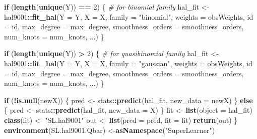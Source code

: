 \documentclass[
]{book}
\newenvironment{Shaded}{\begin{snugshade}}{\end{snugshade}}
\newcommand{\AttributeTok}[1]{\textcolor[rgb]{0.13,0.29,0.53}{#1}}
\newcommand{\CommentTok}[1]{\textcolor[rgb]{0.56,0.35,0.01}{\textit{#1}}}
\newcommand{\ControlFlowTok}[1]{\textcolor[rgb]{0.13,0.29,0.53}{\textbf{#1}}}
\newcommand{\DecValTok}[1]{\textcolor[rgb]{0.00,0.00,0.81}{#1}}
\newcommand{\FunctionTok}[1]{\textcolor[rgb]{0.13,0.29,0.53}{\textbf{#1}}}
\newcommand{\NormalTok}[1]{#1}
\newcommand{\OtherTok}[1]{\textcolor[rgb]{0.56,0.35,0.01}{#1}}
\newcommand{\SpecialCharTok}[1]{\textcolor[rgb]{0.81,0.36,0.00}{\textbf{#1}}}
\newcommand{\StringTok}[1]{\textcolor[rgb]{0.31,0.60,0.02}{#1}}
\begin{document}
\begin{Shaded}
\begin{Highlighting}[]
  \ControlFlowTok{if}\NormalTok{ (}\FunctionTok{length}\NormalTok{(}\FunctionTok{unique}\NormalTok{(Y)) }\SpecialCharTok{==} \DecValTok{2}\NormalTok{) \{ }\CommentTok{\# for binomial family}
\NormalTok{    hal\_fit }\OtherTok{\textless{}{-}}\NormalTok{ hal9001}\SpecialCharTok{::}\FunctionTok{fit\_hal}\NormalTok{(}\AttributeTok{Y =}\NormalTok{ Y, }\AttributeTok{X =}\NormalTok{ X, }\AttributeTok{family =} \StringTok{"binomial"}\NormalTok{, }
                                \AttributeTok{weights =}\NormalTok{ obsWeights, }\AttributeTok{id =}\NormalTok{ id, }\AttributeTok{max\_degree =}\NormalTok{ max\_degree, }
                                \AttributeTok{smoothness\_orders =}\NormalTok{ smoothness\_orders, }\AttributeTok{num\_knots =}\NormalTok{ num\_knots, }
\NormalTok{                                ...)}
\NormalTok{  \}}
  
  \ControlFlowTok{if}\NormalTok{ (}\FunctionTok{length}\NormalTok{(}\FunctionTok{unique}\NormalTok{(Y)) }\SpecialCharTok{\textgreater{}} \DecValTok{2}\NormalTok{) \{ }\CommentTok{\# for quasibinomial family}
\NormalTok{    hal\_fit }\OtherTok{\textless{}{-}}\NormalTok{ hal9001}\SpecialCharTok{::}\FunctionTok{fit\_hal}\NormalTok{(}\AttributeTok{Y =}\NormalTok{ Y, }\AttributeTok{X =}\NormalTok{ X, }\AttributeTok{family =} \StringTok{"gaussian"}\NormalTok{, }
                                \AttributeTok{weights =}\NormalTok{ obsWeights, }\AttributeTok{id =}\NormalTok{ id, }\AttributeTok{max\_degree =}\NormalTok{ max\_degree, }
                                \AttributeTok{smoothness\_orders =}\NormalTok{ smoothness\_orders, }\AttributeTok{num\_knots =}\NormalTok{ num\_knots, }
\NormalTok{                                ...)}
\NormalTok{  \}}
  
  \ControlFlowTok{if}\NormalTok{ (}\SpecialCharTok{!}\FunctionTok{is.null}\NormalTok{(newX)) \{}
\NormalTok{    pred }\OtherTok{\textless{}{-}}\NormalTok{ stats}\SpecialCharTok{::}\FunctionTok{predict}\NormalTok{(hal\_fit, }\AttributeTok{new\_data =}\NormalTok{ newX)}
\NormalTok{  \}}
  \ControlFlowTok{else}\NormalTok{ \{}
\NormalTok{    pred }\OtherTok{\textless{}{-}}\NormalTok{ stats}\SpecialCharTok{::}\FunctionTok{predict}\NormalTok{(hal\_fit, }\AttributeTok{new\_data =}\NormalTok{ X)}
\NormalTok{  \}}
\NormalTok{  fit }\OtherTok{\textless{}{-}} \FunctionTok{list}\NormalTok{(}\AttributeTok{object =}\NormalTok{ hal\_fit)}
  \FunctionTok{class}\NormalTok{(fit) }\OtherTok{\textless{}{-}} \StringTok{"SL.hal9001"}
\NormalTok{  out }\OtherTok{\textless{}{-}} \FunctionTok{list}\NormalTok{(}\AttributeTok{pred =}\NormalTok{ pred, }\AttributeTok{fit =}\NormalTok{ fit)}
  \FunctionTok{return}\NormalTok{(out)}
\NormalTok{\}}
\FunctionTok{environment}\NormalTok{(SL.hal9001.Qbar) }\OtherTok{\textless{}{-}}\FunctionTok{asNamespace}\NormalTok{(}\StringTok{"SuperLearner"}\NormalTok{)}


\end{Highlighting}
\end{Shaded}
\end{document}
